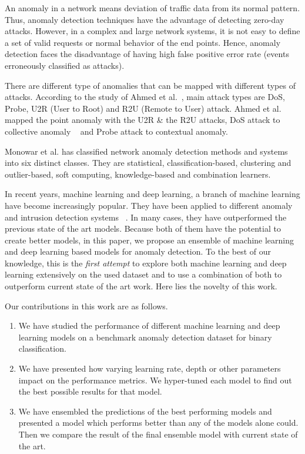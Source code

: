 \documentclass[14pt, conference]{IEEEtran}
\begin{document}
An anomaly in a network means deviation of traffic data from its normal pattern. Thus, anomaly detection techniques have the advantage of detecting zero-day attacks. However, in a complex and large network systems,  it is not easy to define a set of valid requests or normal behavior of the end points. Hence, anomaly detection faces the disadvantage of having high false positive error rate (events erroneously classified as attacks).

There are different type of anomalies that can be mapped with different types of attacks. According to the study of Ahmed et al.~\cite{ahmed2016survey}, main attack types are DoS, Probe, U2R (User to Root) and R2U (Remote to User) attack. Ahmed et al. ~\cite{ahmed2016survey} mapped the point anomaly with the U2R \& the R2U attacks, DoS attack to collective anomaly ~\cite{ahmed2014network} and Probe attack to contextual anomaly. 

Monowar et al. \cite{6524462} has classified network anomaly detection methods and systems into six distinct classes. They are statistical, classification-based, clustering and outlier-based, soft computing, knowledge-based and combination learners. 

In recent years, machine learning and deep learning, a branch of machine learning have become increasingly popular. They have been applied to different anomaly and intrusion detection systems~\cite{Kwon2017} \cite{casas2016machine}. In many cases, they have outperformed the previous state of the art models. Because both of them have the potential to create better models, in this paper, we propose an ensemble of machine learning and deep learning based models for anomaly detection. To the best of our knowledge, this is the \textit{first attempt} to explore both machine learning and deep learning extensively on the used dataset and to use a combination of both to outperform current state of the art work. Here lies the novelty of this work.

Our contributions in this work are as follows. 
\begin{enumerate}
    \item We have studied the performance of different machine learning and deep learning models on a benchmark anomaly detection dataset \cite{moustafa2015unsw} for binary classification.
    \item We have presented how varying learning rate, depth or other parameters impact on the performance metrics. We hyper-tuned each model to find out the best possible results for that model.
    \item We have ensembled the predictions of the best performing models and presented a model which performs better than any of the models alone could. Then we compare the result of the final ensemble model with current state of the art.
\end{enumerate}
\end{document}
